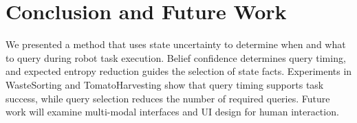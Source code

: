 \section{Conclusion and Future Work}
We presented a method that uses state uncertainty to determine when and what to query during robot task execution. Belief confidence determines query timing, and expected entropy reduction guides the selection of state facts. Experiments in WasteSorting and TomatoHarvesting show that query timing supports task success, while query selection reduces the number of required queries. Future work will examine multi-modal interfaces and UI design for human interaction.